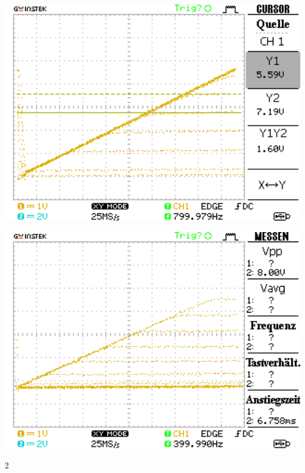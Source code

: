 \documentclass[10pt]{article}
\newenvironment{Figure}
  {\par\medskip\noindent\minipage{\linewidth}}
  {\endminipage\par\medskip}
\begin{document}
\begin{multicols}{2}
\begin{Figure}
		\centering\includegraphics[width=1\textwidth]{data/Kennlinie4_npn.png}
		\label{fig:1.6}
	\end{Figure}


	\begin{Figure}
		\centering\includegraphics[width=1\textwidth]{data/DS0000.png}
		\label{fig:1.7}
	\end{Figure}


\end{multicols}{2}
\clearpage
\listoffigures
\listoftables



\end{document}
